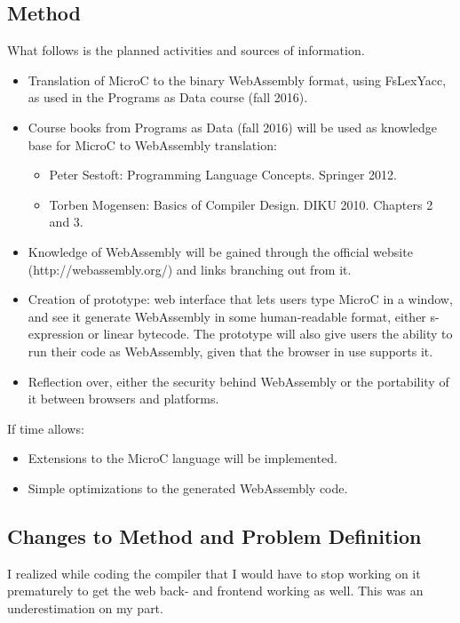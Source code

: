 \documentclass[a4paper]{article}
\makeatletter
\newcommand\footnoteref[1]{\protected@xdef\@thefnmark{\ref{#1}}\@footnotemark}
\makeatother
\begin{document}
\subsection{Method}
\label{sec:problem-definition:method}
What follows is the planned activities and sources of information.
\begin{itemize}
	\item Translation of MicroC to the binary WebAssembly format, using FsLexYacc\footnoteref{footnote:fslexyacc-url}, as used in the Programs as Data course (fall 2016).
	\item Course books from Programs as Data (fall 2016) will be used as knowledge base for MicroC to WebAssembly translation:
		\begin{itemize}
			\item Peter Sestoft: Programming Language Concepts. Springer 2012.
			\item Torben Mogensen: Basics of Compiler Design. DIKU 2010. Chapters 2 and 3.
		\end{itemize}
	\item Knowledge of WebAssembly will be gained through the official website (http://webassembly.org/) and links branching out from it.
	\item Creation of prototype: web interface that lets users type MicroC in a window, and see it generate WebAssembly in some human-readable format, either s-expression or linear bytecode. The prototype will also give users the ability to run their code as WebAssembly, given that the browser in use supports it.
	\item Reflection over, either the security behind WebAssembly or the portability of it between browsers and platforms.
\end{itemize}

\noindent If time allows:
\begin{itemize}
	\item Extensions to the MicroC language will be implemented.
	\item Simple optimizations to the generated WebAssembly code.
\end{itemize}

\subsection{Changes to Method and Problem Definition}
\label{sec:problem-definition:changes}
I realized while coding the compiler that I would have to stop working on it prematurely to get the web back- and frontend working as well. This was an underestimation on my part.
\end{document}
